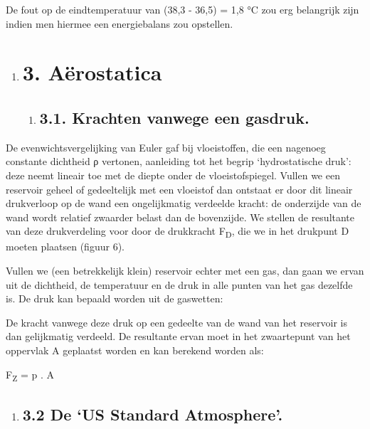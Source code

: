 \documentclass[]{article}
\begin{document}
De fout op de eindtemperatuur van (38,3 - 36,5) = 1,8 °C zou erg
belangrijk zijn indien men hiermee een energiebalans zou opstellen.

\begin{enumerate}
\item
  \section{3. Aërostatica}\label{auxebrostatica}

  \begin{enumerate}
  \item
    \subsection{3.1. Krachten vanwege een
    gasdruk.}\label{krachten-vanwege-een-gasdruk.}
  \end{enumerate}
\end{enumerate}

De evenwichtsvergelijking van Euler gaf bij vloeistoffen, die een
nagenoeg constante dichtheid ρ vertonen, aanleiding tot het begrip
`hydrostatische druk': deze neemt lineair toe met de diepte onder de
vloeistofspiegel. Vullen we een reservoir geheel of gedeeltelijk met een
vloeistof dan ontstaat er door dit lineair drukverloop op de wand een
ongelijkmatig verdeelde kracht: de onderzijde van de wand wordt relatief
zwaarder belast dan de bovenzijde. We stellen de resultante van deze
drukverdeling voor door de drukkracht F\textsubscript{D}, die we in het
drukpunt D moeten plaatsen (figuur 6).

Vullen we (een betrekkelijk klein) reservoir echter met een gas, dan
gaan we ervan uit de dichtheid, de temperatuur en de druk in alle punten
van het gas dezelfde is. De druk kan bepaald worden uit de gaswetten:

De kracht vanwege deze druk op een gedeelte van de wand van het
reservoir is dan gelijkmatig verdeeld. De resultante ervan moet in het
zwaartepunt van het oppervlak A geplaatst worden en kan berekend worden
als:

F\textsubscript{Z} = p . A

\begin{enumerate}
\item
  \subsection{3.2 De `US Standard
  Atmosphere'.}\label{de-us-standard-atmosphere.}
\end{enumerate}
\end{document}
